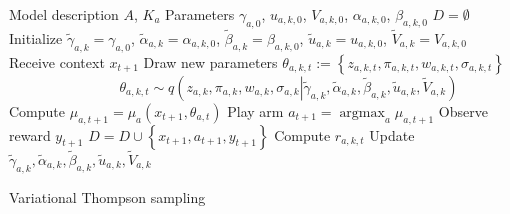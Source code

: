 \documentclass{article}
\newcommand{\deq}{:=} %
\newcommand{\argmax}{\mathop{\mathrm{argmax}}}
\begin{document}
\begin{algorithm}
	\begin{algorithmic}[1]
	\REQUIRE Model description $A$, $K_a$
	\REQUIRE Parameters $\gamma_{a,0}$, $u_{a,k,0}$, $V_{a,k,0}$, $\alpha_{a,k,0}$, $\beta_{a,k,0}$
	\STATE $D=\emptyset$
	\STATE Initialize $\widetilde{\gamma}_{a,k}=\gamma_{a,0}$, $\widetilde{\alpha}_{a,k}=\alpha_{a,k,0}$, $\widetilde{\beta}_{a,k}=\beta_{a,k,0}$, $ \widetilde{u}_{a,k}=u_{a,k,0}$, $\widetilde{V}_{a,k}=V_{a,k,0}$
		\STATE Receive context $x_{t+1}$
				\STATE Draw new parameters $\theta_{a,k,t} \deq \left\{z_{a,k,t},\pi_{a,k,t},w_{a,k,t},\sigma_{a,k,t} \right\}$
				$$\qquad \qquad \theta_{a,k,t} \sim q\left(z_{a,k},\pi_{a,k},w_{a,k},\sigma_{a,k} \left| \widetilde{\gamma}_{a,k}, \widetilde{\alpha}_{a,k}, \widetilde{\beta}_{a,k}, \widetilde{u}_{a,k}, \widetilde{V}_{a,k} \right.\right)$$
			\ENDFOR
			\STATE Compute $\mu_{a,t+1}=\mu_{a}(x_{t+1},\theta_{a,t})$
		\ENDFOR
		\STATE Play arm $a_{t+1}=\argmax_{a}\mu_{a,t+1}$
		\STATE Observe reward $y_{t+1}$
		\STATE $D=D \cup \left\{x_{t+1}, a_{t+1}, y_{t+1}\right\}$
			\STATE Compute $r_{a,k,t}$
			\STATE Update $\widetilde{\gamma}_{a,k}, \widetilde{\alpha}_{a,k}, \widetilde{\beta}_{a,k}, \widetilde{u}_{a,k}, \widetilde{V}_{a,k}$
		\ENDWHILE
	\ENDFOR
	\end{algorithmic}
	\caption{Variational Thompson sampling}
	\label{alg:vts}
\end{algorithm}
\end{document}
